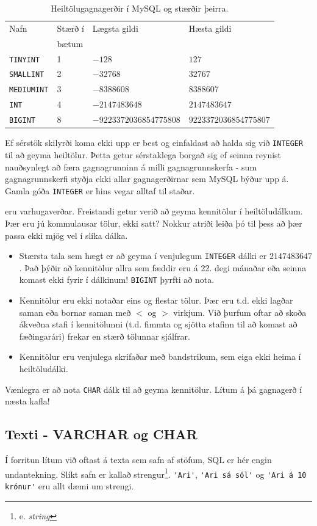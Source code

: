 \begin{table}
\centering
\caption[Heiltöludálkar]{Heiltölugagnagerðir í MySQL og stærðir þeirra.}
\label{tafla:heiltolur}
\begin{tabular}{llll}
\toprule
Nafn&Stærð í&Lægsta gildi&Hæsta gildi\\
&bætum&&\\
\midrule
\verb|TINYINT|&1&$-128$&$127$\\
\verb|SMALLINT|&2&$-32768$&$32767$\\
\verb|MEDIUMINT|&3&$-8388608$&$8388607$\\
\verb|INT|&4&$-2147483648$&$2147483647$\\
\verb|BIGINT|&8&$-9223372036854775808$&$9223372036854775807$\\
\bottomrule
\end{tabular}
\end{table}

Ef sérstök skilyrði koma ekki upp er best og einfaldast að halda sig við \verb|INTEGER| til að geyma heiltölur. Þetta getur sérstaklega borgað sig ef seinna reynist nauðsynlegt að færa gagnagrunninn á milli gagnagrunnskerfa - sum gagnagrunnskerfi styðja ekki allar gagnagerðirnar sem MySQL býður upp á. Gamla góða \verb|INTEGER| er hins vegar alltaf til staðar.

 eru varhugaverðar. Freistandi getur verið að geyma kennitölur í heiltöludálkum. Þær eru jú kommulausar tölur, ekki satt? Nokkur atriði leiða þó til þess að þær passa ekki mjög vel í slíka dálka.

\begin{itemize}
 \item Stærsta tala sem hægt er að geyma í venjulegum \verb|INTEGER| dálki er $2147483647$. Það þýðir að kennitölur allra sem fæddir eru á 22. degi mánaðar eða seinna komast ekki fyrir í dálkinum! \verb|BIGINT| þyrfti að nota.
 \item Kennitölur eru ekki notaðar eins og flestar tölur. Þær eru t.d. ekki lagðar saman eða bornar saman með $<$ og $>$ virkjum. Við þurfum oftar að skoða ákveðna stafi í kennitölunni (t.d. fimmta og sjötta stafinn til að komast að fæðingarári) frekar en stærð tölunnar sjálfrar.
 \item Kennitölur eru venjulega skrifaðar með bandstrikum, sem eiga ekki heima í heiltöludálki.
\end{itemize}
Vænlegra er að nota \verb|CHAR| dálk til að geyma kennitölur. Lítum á þá gagnagerð í næsta kafla!

\subsection{Texti - VARCHAR og CHAR}
\label{undirkafli:texti}
Í forritun lítum við oftast á texta sem safn af stöfum, SQL er hér engin undantekning. Slíkt safn er kallað strengur\footnote{e. \emph{string}}. \verb|'Ari'|, \verb|'Ari sá sól'| og \verb|'Ari á 10 krónur'| eru allt dæmi um strengi. 

